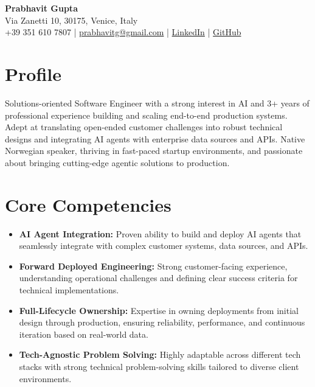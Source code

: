 \documentclass[11pt,a4paper]{article}
\begin{document}
\begin{center}
    {\Huge \textbf{Prabhavit Gupta}} \\
    \vspace{5pt}
    Via Zanetti 10, 30175, Venice, Italy \\
    +39 351 610 7807 | \href{mailto:prabhavitg@gmail.com}{prabhavitg@gmail.com} | \href{https://www.linkedin.com/in/prabhavit/}{LinkedIn} | \href{https://github.com/prab-gupta}{GitHub}
\end{center}

\vspace{10pt}

\section*{Profile}
Solutions-oriented Software Engineer with a strong interest in AI and 3+ years of professional experience building and scaling end-to-end production systems. Adept at translating open-ended customer challenges into robust technical designs and integrating AI agents with enterprise data sources and APIs. Native Norwegian speaker, thriving in fast-paced startup environments, and passionate about bringing cutting-edge agentic solutions to production.

\section*{Core Competencies}
\begin{itemize}
    \item \textbf{AI Agent Integration:} Proven ability to build and deploy AI agents that seamlessly integrate with complex customer systems, data sources, and APIs.
    \item \textbf{Forward Deployed Engineering:} Strong customer-facing experience, understanding operational challenges and defining clear success criteria for technical implementations.
    \item \textbf{Full-Lifecycle Ownership:} Expertise in owning deployments from initial design through production, ensuring reliability, performance, and continuous iteration based on real-world data.
    \item \textbf{Tech-Agnostic Problem Solving:} Highly adaptable across different tech stacks with strong technical problem-solving skills tailored to diverse client environments.
\end{itemize}
\end{document}
